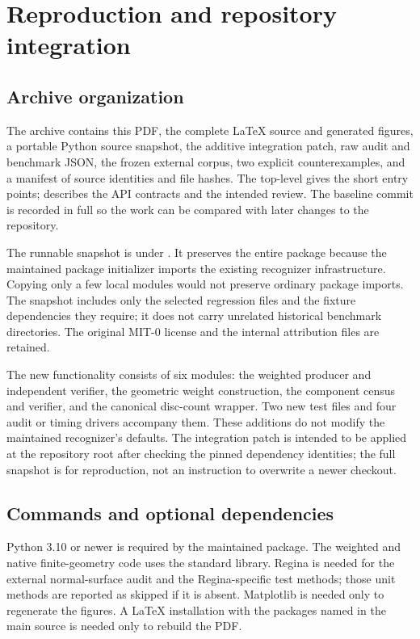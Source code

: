 \section{Reproduction and repository integration}
\label{sec:reproduction}

\subsection{Archive organization}

The archive contains this PDF, the complete \LaTeX{} source and generated
figures, a portable Python source snapshot, the additive integration patch,
raw audit and benchmark JSON, the frozen external corpus, two explicit
counterexamples, and a manifest of source identities and file hashes.
The top-level  gives the short entry points;
 describes the API contracts and the intended review.
The baseline commit is recorded in full so the work can be compared with
later changes to the repository.

The runnable snapshot is under . It preserves the entire
 package because the maintained package initializer imports
the existing recognizer infrastructure. Copying only a few local modules
would not preserve ordinary package imports. The snapshot includes only the
selected regression files and the fixture dependencies they require; it does
not carry unrelated historical benchmark directories. The original MIT-0
license and the internal attribution files are retained.

The new functionality consists of six modules: the weighted producer and
independent verifier, the geometric weight construction, the component
census and verifier, and the canonical disc-count wrapper. Two new test files
and four audit or timing drivers accompany them. These additions do not
modify the maintained recognizer's defaults. The integration patch is
intended to be applied at the repository root after checking the pinned
dependency identities; the full snapshot is for reproduction, not an
instruction to overwrite a newer checkout.

\subsection{Commands and optional dependencies}

Python 3.10 or newer is required by the maintained package. The weighted and
native finite-geometry code uses the standard library. Regina is needed for
the external normal-surface audit and the Regina-specific test methods;
those unit methods are reported as skipped if it is absent. Matplotlib is
needed only to regenerate the figures. A \LaTeX{} installation with the
packages named in the main source is needed only to rebuild the PDF.

